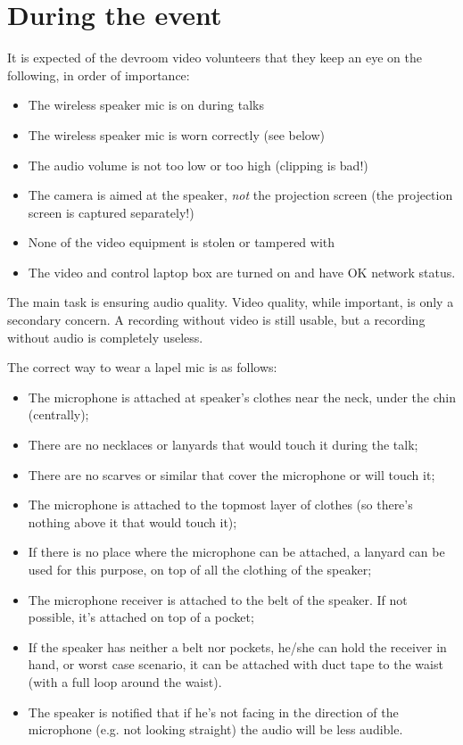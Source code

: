 \documentclass{article}
\begin{document}
\section{During the event}
It is expected of the devroom video volunteers that they keep an eye on the following, in order of importance:
\begin{itemize}
  \item The wireless speaker mic is on during talks
  \item The wireless speaker mic is worn correctly (see below)
  \item The audio volume is not too low or too high (clipping is bad!)
  \item The camera is aimed at the speaker, \emph{not} the projection screen (the projection screen is captured separately!)
  \item None of the video equipment is stolen or tampered with
  \item The video and control laptop box are turned on and have OK network status.
\end{itemize}
The main task is ensuring audio quality. Video quality, while important, is only a secondary concern. A recording without video is still usable, but a recording without audio is completely useless.

The correct way to wear a lapel mic is as follows:
\begin{itemize}
  \item The microphone is attached at speaker's clothes near the neck, under the chin (centrally);
  \item There are no necklaces or lanyards that would touch it during the talk;
  \item There are no scarves or similar that cover the microphone or will touch it;
  \item The microphone is attached to the topmost layer of clothes (so there's nothing above it that would touch it);
  \item If there is no place where the microphone can be attached, a lanyard can be used for this purpose, on top of all the clothing of the speaker;
  \item The microphone receiver is attached to the belt of the speaker. If not possible, it's attached on top of a pocket;
  \item If the speaker has neither a belt nor pockets, he/she can hold the receiver in hand, or worst case scenario, it can be attached with duct tape to the waist (with a full loop around the waist).
  \item The speaker is notified that if he's not facing in the direction of the microphone (e.g. not looking straight) the audio will be less audible.
\end{itemize}
\end{document}
